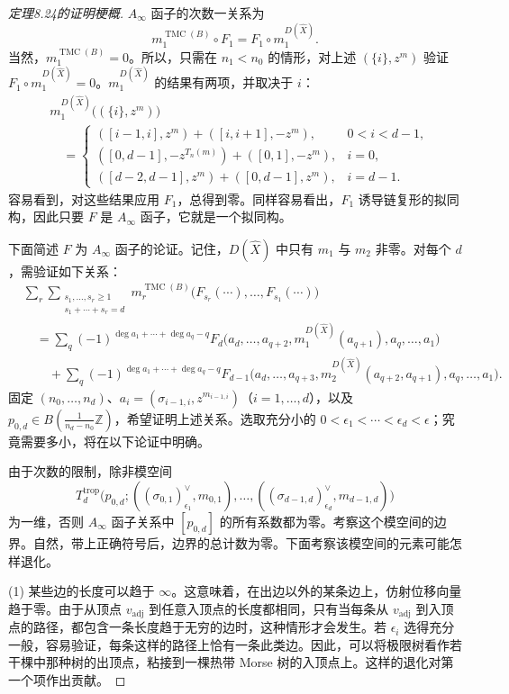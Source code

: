 \begin{proof}[定理8.24的证明梗概]
$A_\infty$ 函子的次数一关系为
\[
m_1^{\operatorname{TMC}(B)}\circ F_1
=F_1\circ m_1^{D(\widehat X)}.
\]
当然，$m_1^{\operatorname{TMC}(B)}=0$。所以，只需在 $n_1<n_0$ 的情形，对上述 $(\{i\},z^m)$ 验证 $F_1\circ m_1^{D(\widehat X)}=0$。$m_1^{D(\widehat X)}$ 的结果有两项，并取决于 $i$：
\[
\begin{aligned}
&m_1^{D(\widehat X)}\bigl((\{i\},z^m)\bigr)\\
&\quad=\begin{cases}
([i-1,i],z^m)+([i,i+1],-z^m),&0<i<d-1,\\
([0,d-1],-z^{T_n(m)})+([0,1],-z^m),&i=0,\\
([d-2,d-1],z^m)+([0,d-1],z^m),&i=d-1.
\end{cases}
\end{aligned}
\]
容易看到，对这些结果应用 $F_1$，总得到零。同样容易看出，$F_1$ 诱导链复形的拟同构，因此只要 $F$ 是 $A_\infty$ 函子，它就是一个拟同构。

下面简述 $F$ 为 $A_\infty$ 函子的论证。记住，$D(\widehat X)$ 中只有 $m_1$ 与 $m_2$ 非零。对每个 $d$，需验证如下关系：
\[
\begin{aligned}
&\sum_r\sum_{\substack{s_1,\ldots,s_r\geq1\\s_1+\cdots+s_r=d}}
m_r^{\operatorname{TMC}(B)}
\bigl(F_{s_r}(\cdots),\ldots,F_{s_1}(\cdots)\bigr)\\
&\quad=\sum_q(-1)^{\deg a_1+\cdots+\deg a_q-q}
F_d\bigl(a_d,\ldots,a_{q+2},m_1^{D(\widehat X)}(a_{q+1}),
a_q,\ldots,a_1\bigr)\\
&\qquad+\sum_q(-1)^{\deg a_1+\cdots+\deg a_q-q}
F_{d-1}\bigl(a_d,\ldots,a_{q+3},m_2^{D(\widehat X)}(a_{q+2},a_{q+1}),
a_q,\ldots,a_1\bigr).
\end{aligned}
\]
固定 $(n_0,\ldots,n_d)$、$a_i=(\sigma_{i-1,i},z^{m_{i-1,i}})$（$i=1,\ldots,d$），以及 $p_{0,d}\in B(\frac1{n_d-n_0}\mathbb Z)$，希望证明上述关系。选取充分小的 $0<\epsilon_1<\cdots<\epsilon_d<\epsilon$；究竟需要多小，将在以下论证中明确。

由于次数的限制，除非模空间
\[
T_d^{\mathrm{trop}}\bigl(p_{0,d};
((\sigma_{0,1})_{\epsilon_1}^\vee,m_{0,1}),\ldots,
((\sigma_{d-1,d})_{\epsilon_d}^\vee,m_{d-1,d})\bigr)
\]
为一维，否则 $A_\infty$ 函子关系中 $[p_{0,d}]$ 的所有系数都为零。考察这个模空间的边界。自然，带上正确符号后，边界的总计数为零。下面考察该模空间的元素可能怎样退化。

(1) 某些边的长度可以趋于 $\infty$。这意味着，在出边以外的某条边上，仿射位移向量趋于零。由于从顶点 $v_{\mathrm{adj}}$ 到任意入顶点的长度都相同，只有当每条从 $v_{\mathrm{adj}}$ 到入顶点的路径，都包含一条长度趋于无穷的边时，这种情形才会发生。若 $\epsilon_i$ 选得充分一般，容易验证，每条这样的路径上恰有一条此类边。因此，可以将极限树看作若干棵中那种树的出顶点，粘接到一棵热带 Morse 树的入顶点上。这样的退化对第一个项作出贡献。


\end{proof}
